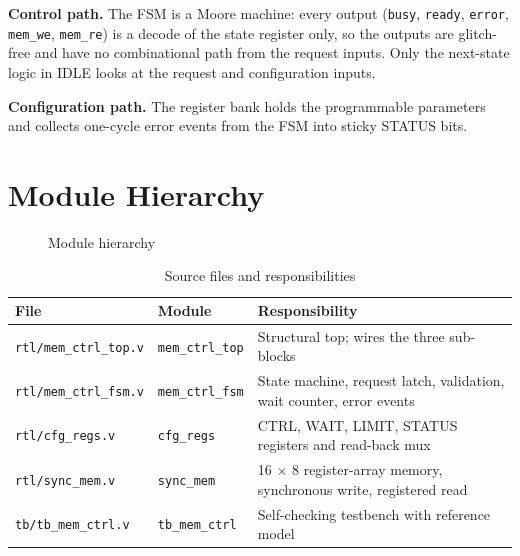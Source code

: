 \documentclass[11pt,a4paper]{article}
\newcommand{\sig}[1]{\texttt{#1}}
\begin{document}
\textbf{Control path.} The FSM is a Moore machine: every output (\sig{busy}, \sig{ready}, \sig{error}, \sig{mem\_we}, \sig{mem\_re}) is a decode of the state register only, so the outputs are glitch-free and have no combinational path from the request inputs. Only the next-state logic in IDLE looks at the request and configuration inputs.

\textbf{Configuration path.} The register bank holds the programmable parameters and collects one-cycle error events from the FSM into sticky STATUS bits.

\section{Module Hierarchy}
\begin{figure}[H]
\centering
{}
\caption{Module hierarchy}
\label{fig:hier}
\end{figure}

\begin{table}[H]
\centering
\caption{Source files and responsibilities}
\label{tab:files}
\small
\begin{tabularx}{\textwidth}{@{}l l X@{}}
\toprule
\textbf{File} & \textbf{Module} & \textbf{Responsibility} \\
\midrule
\sig{rtl/mem\_ctrl\_top.v} & \sig{mem\_ctrl\_top} & Structural top; wires the three sub-blocks \\
\sig{rtl/mem\_ctrl\_fsm.v} & \sig{mem\_ctrl\_fsm} & State machine, request latch, validation, wait counter, error events \\
\sig{rtl/cfg\_regs.v} & \sig{cfg\_regs} & CTRL, WAIT, LIMIT, STATUS registers and read-back mux \\
\sig{rtl/sync\_mem.v} & \sig{sync\_mem} & 16 $\times$ 8 register-array memory, synchronous write, registered read \\
\sig{tb/tb\_mem\_ctrl.v} & \sig{tb\_mem\_ctrl} & Self-checking testbench with reference model \\
\bottomrule
\end{tabularx}
\end{table}
\end{document}
